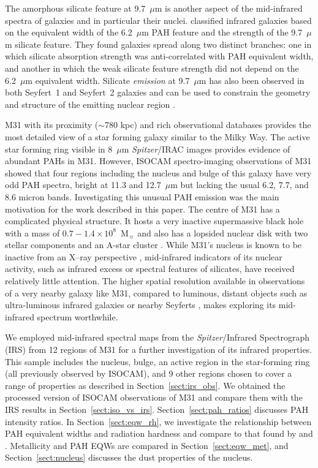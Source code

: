 The amorphous silicate feature at 9.7~$\mu$m is another aspect of the mid-infrared spectra of galaxies and in particular their nuclei.  \citet{Spoon2007} 
classified infrared galaxies based on the equivalent width of the 6.2~$\mu$m PAH feature and the strength of the 9.7~$\mu$m silicate feature. 
They  found galaxies spread along two distinct branches: one in which silicate absorption strength was anti-correlated with PAH
equivalent width, and another in which the weak silicate feature strength did not depend on the 6.2~$\mu$m equivalent width.
Silicate {\em emission} at 9.7~$\mu$m has also been observed in both Seyfert~1 and Seyfert~2 galaxies 
and can be used to constrain the geometry and structure of the emitting nuclear region \citep{Mason2009}.



M31 with its proximity ($\sim$780 kpc) and rich observational databases provides the most detailed view of a star forming galaxy similar 
to the Milky Way. The active star forming ring visible in 8~$\mu$m  {\em Spitzer}/IRAC images \citep{Barmby2006lr} provides evidence of abundant PAHs in M31. 
However, ISOCAM spectro-imaging observations of M31\citep{1998Cesarsky} showed that four regions including the nucleus and bulge 
of this galaxy have very odd PAH spectra, bright at 11.3 and 12.7~$\mu$m but lacking the usual 6.2, 7.7, and 8.6 micron bands. 
Investigating this unusual PAH emission was the main motivation for the work described in this paper. 
The centre of M31 has a complicated physical structure. It hosts a very inactive supermassive black hole with a mass of 
$0.7-1.4 \times 10^8$~M$_{\sun}$ \citep{Bacon2001, Bender2005} and also has a lopsided nuclear disk  with two stellar 
components and an A-star cluster \citep{Lauer1993}. While M31's nucleus is known to be inactive from an 
X--ray perspective \citep{Li2011}, mid-infrared indicators of its nuclear activity, such
as infrared excess or spectral features of silicates,  have received relatively little attention. 
The higher spatial resolution available in observations of  a very nearby galaxy like M31, compared to 
luminous, distant objects such as ultra-luminous infrared galaxies \citep{Spoon2007} or nearby Seyferts \citep{Mason2009},
makes exploring its mid-infrared spectrum worthwhile.


We employed mid-infrared spectral maps from the {\em Spitzer}/Infrared Spectrograph (IRS) from 12 regions of M31 for a further investigation of 
its infrared properties. This sample includes the nucleus, bulge, an active region in the star-forming ring (all previously observed by ISOCAM), and 9 
other regions chosen to cover a range of properties as described in Section~\ref{sect:irs_obs}. 
We obtained the processed version of ISOCAM observations of M31 and compare them with the IRS results in Section~\ref{sect:iso_vs_irs}. 
Section~\ref{sect:pah_ratios} discusses PAH intensity ratios.
In Section~\ref{sect:eqw_rh}, we investigate the relationship between PAH equivalent widths and radiation 
hardness and compare to that found by \citet{Engelbracht_2008} and \citet{Gordon:2008lr}. Metallicity and PAH EQWs are compared in 
Section~\ref{sect:eqw_met}, and Section~\ref{sect:nucleus} discusses the dust properties of the nucleus. 	

